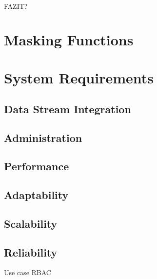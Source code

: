 FAZIT?

\section{Masking Functions}

\section{System Requirements}
\subsection{Data Stream Integration}
\subsection{Administration}
\subsection{Performance}
\subsection{Adaptability}
\subsection{Scalability}
\subsection{Reliability}

Use case
RBAC



    
